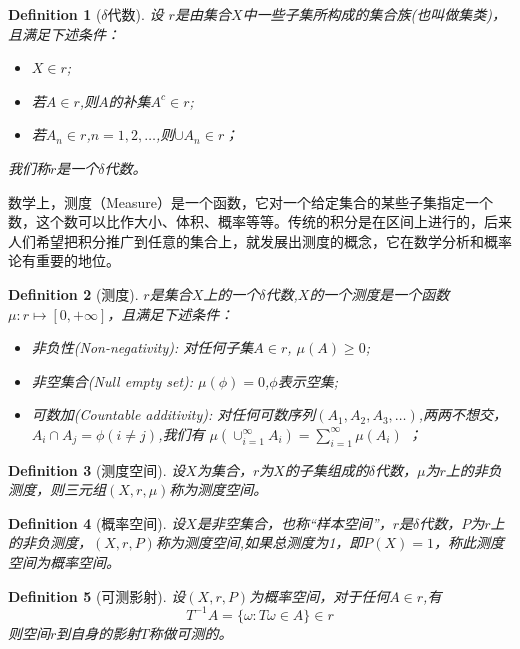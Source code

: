 \documentclass[]{article}
\newtheorem {definition}{Definition}
\begin{document}
\begin{definition}[$\delta$代数]
	设
	$r$是由集合$X$中一些子集所构成的集合族(也叫做集类)，且满足下述条件：
	\begin{itemize}
		\item $X\in r$;
		\item 若$A\in r$,则$A$的补集$A^c \in r$;
		\item 若$A_n\in r$,$n=1,2,\ldots$,则$\cup A_n \in r$；
	\end{itemize}
	我们称$r$是一个$\delta$代数。
\end{definition}

数学上，测度（Measure）是一个函数，它对一个给定集合的某些子集指定一个数，这个数可以比作大小、体积、概率等等。传统的积分是在区间上进行的，后来人们希望把积分推广到任意的集合上，就发展出测度的概念，它在数学分析和概率论有重要的地位。\par

\begin{definition}[测度]{}
	$r$是集合$X$上的一个$\delta$代数,$X$的一个测度是一个函数$\mu : r\longmapsto [0,+\infty]$，且满足下述条件：
	\begin{itemize}
		\item 非负性(Non-negativity): 对任何子集$A\in r$, $\mu (A) \geq 0$;
		\item 非空集合(Null empty set): $\mu(\phi) = 0$,$\phi$表示空集;
		\item 可数加(Countable additivity): 对任何可数序列$(A_1,A_2,A_3,\ldots)$,两两不想交，$A_i\cap A_j=\phi (i\neq j)$,我们有
		$\mu (\cup_{i=1}^{\infty} A_i)= \sum_{i=1}^{\infty} \mu(A_i)$ ；
	\end{itemize}
\end{definition}

\begin{definition}[测度空间]
	设$X$为集合，$r$为$X$的子集组成的$\delta$代数，$\mu$为$r$上的非负测度，则三元组$(X,r,\mu)$称为测度空间。
\end{definition}

\begin{definition}[概率空间]
	设$X$是非空集合，也称“样本空间”，$r$是$\delta$代数，$P$为$r$上的非负测度，$(X,r,P)$称为测度空间,如果总测度为1，即$P(X)=1$，称此测度空间为概率空间。
\end{definition}

\begin{definition}[可测影射]
	设$(X,r,P)$为概率空间，对于任何$A\in r$,有
	\[T^{-1}A=\{\omega:T\omega \in A\} \in r\]
	则空间$r$到自身的影射$T$称做可测的。
\end{definition}
\end{document}
